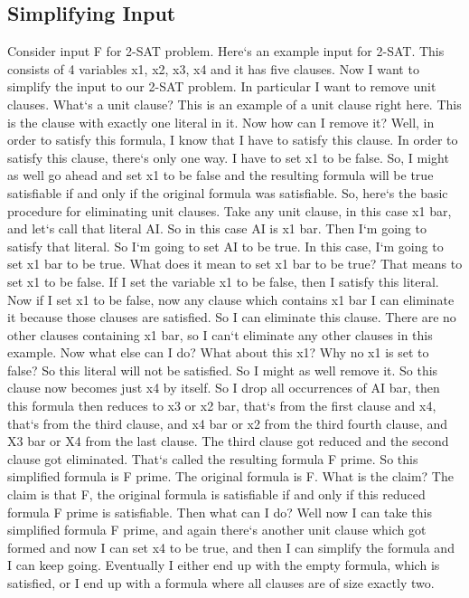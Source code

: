 \subsection{Simplifying Input}
Consider input F for 2-SAT problem.
Here`s an example input for 2-SAT\@.
This consists of 4 variables x1, x2, x3, x4 and it has five clauses.
Now I want to simplify the input to our 2-SAT problem.
In particular I want to remove unit clauses.
What`s a unit clause? This is an example of a unit clause right here.
This is the clause with exactly one literal in it.
Now how can I remove it? Well, in order to satisfy this formula, I know that I have to satisfy this clause.
In order to satisfy this clause, there`s only one way.
I have to set x1 to be false.
So, I might as well go ahead and set x1 to be false and the resulting formula will be true satisfiable if and only if the original formula was satisfiable.
So, here`s the basic procedure for eliminating unit clauses.
Take any unit clause, in this case x1 bar, and let`s call that literal AI\@.
So in this case AI is x1 bar.
Then I`m going to satisfy that literal.
So I`m going to set AI to be true.
In this case, I`m going to set x1 bar to be true.
What does it mean to set x1 bar to be true? That means to set x1 to be false.
If I set the variable x1 to be false, then I satisfy this literal.
Now if I set x1 to be false, now any clause which contains x1 bar I can eliminate it because those clauses are satisfied.
So I can eliminate this clause.
There are no other clauses containing x1 bar, so I can`t eliminate any other clauses in this example.
Now what else can I do? What about this x1? Why no x1 is set to false? So this literal will not be satisfied.
So I might as well remove it.
So this clause now becomes just x4 by itself.
So I drop all occurrences of AI bar, then this formula then reduces to x3 or x2 bar, that`s from the first clause and x4, that`s from the third clause, and x4 bar or x2 from the third fourth clause, and X3 bar or X4 from the last clause.
The third clause got reduced and the second clause got eliminated.
That`s called the resulting formula F prime.
So this simplified formula is F prime.
The original formula is F\@.
What is the claim? The claim is that F, the original formula is satisfiable if and only if this reduced formula F prime is satisfiable.
Then what can I do? Well now I can take this simplified formula F prime, and again there`s another unit clause which got formed and now I can set x4 to be true, and then I can simplify the formula and I can keep going.
Eventually I either end up with the empty formula, which is satisfied, or I end up with a formula where all clauses are of size exactly two.
